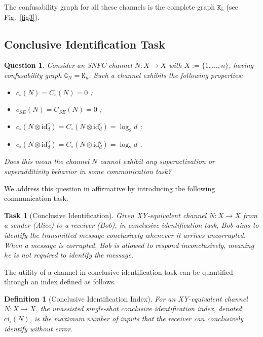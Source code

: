 \documentclass[12pt,a4paper]{article}
\newtheorem{question}{Question}
\newtheorem{definition}{Definition}
\newtheorem*{task}{Task}
\begin{document}
\noindent The confusability graph for all these channels is the complete graph $\mathtt{K}_5$ (see Fig.~\ref{fig3}). 


\subsection{Conclusive Identification Task}
\begin{question}\label{qu1}
Consider an SNFC channel $N : X \to X$ with $X := \{1, \ldots, n\}$, having confusability graph $\mathtt{G}_N = \mathtt{K}_n$. Such a channel exhibits the following properties:
\begin{itemize}[itemsep=-.15cm, parsep=.15cm, topsep=2pt, leftmargin=1.0cm]
\item[\emph{P1)}] $c_\circ(N) = C_\circ(N) = 0$ \cite{Shannon1956};
\item[\emph{P2)}] $c_{SE}(N) = C_{SE}(N) = 0$ \cite{Cubitt2010};
\item[\emph{P3)}] $c_\circ(N \otimes \mathrm{id}^c_d) = C_\circ(N \otimes \mathrm{id}^c_d) = \log_2 d$ ;
\item[\emph{P4)}] $c_\circ(N \otimes \mathrm{id}^q_d) = C_\circ(N \otimes \mathrm{id}^q_d) = \log_2 d$  \cite{Ambuj2026}.
\end{itemize}
Does this mean the channel $N$ cannot exhibit any superactivation or superadditivity behavior in some communication task?
\end{question}

\noindent We address this question in affirmative by introducing the following communication task. 

\begin{task}[Conclusive Identification]\label{task-CI}
Given XY-equivalent channel $N : X \to X$ from a sender (Alice) to a receiver (Bob), in conclusive identification task, Bob aims to identify the transmitted message conclusively whenever it arrives uncorrupted. When a message is corrupted, Bob is allowed to respond inconclusively, meaning he is not required to identify the message.
\end{task}


\noindent The utility of a channel in conclusive identification task can be quantified through an index defined as follows. 

\begin{definition}[Conclusive Identification Index]\label{def9}
For an XY-equivalent channel $N : X \to X$, the unassisted single-shot conclusive identification index, denoted $\mathrm{ci}_\circ(N)$, is the maximum number of inputs that the receiver can conclusively identify without error. 
\end{definition}
\end{document}
